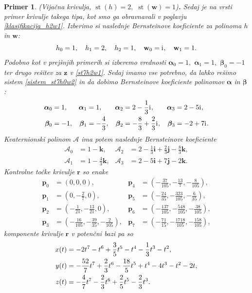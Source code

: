 \documentclass[12pt,a4paper,twoside]{article}
\newcommand{\iu}{\mathrm{i}\mkern1mu} %
\theoremstyle{definition} %
\theoremstyle{plain} %
\theoremstyle{primerstyle}
\newtheorem{primer}[definicija]{Primer}
\numberwithin{equation}{section}  %
\newcommand{\pV}{\mathbf{p}}
\newcommand{\rV}{\mathbf{r}}
\newcommand{\iV}{\mathbf{i}}
\newcommand{\jV}{\mathbf{j}}
\newcommand{\kV}{\mathbf{k}}
\newcommand{\wV}{\mathbf{w}}
\newcommand{\zV}{\mathbf{z}}
\newcommand{\AQ}{\mathcal{A}}
\newcommand{\balpha}{\boldsymbol \alpha}
\newcommand{\bbeta}{\boldsymbol \beta}
\DeclareMathOperator{\st}{st}
\begin{document}
\begin{primer}
	\label{primer_h2w1_vijacna}
	\textnormal{ }(Vijačna krivulja, $\st(h)=2,$ $\st(\wV)=1$)\textbf{.}
	Sedaj je na vrsti primer krivulje takega tipa, kot smo ga obravnavali v poglavju \ref{klasifikacija_h2w1}. Izberimo si naslednje Bernsteinove koeficiente za polinoma $h$ in $\wV$:
	$$h_0=1,\quad h_1=2,\quad h_2=1,\quad\wV_0=\iu,\quad\wV_1=1.$$
	Podobno kot v prejšnjih primerih si izberemo vrednosti $\balpha_0=1,$ $\balpha_1=1,$ $\bbeta_0=-1$ ter drugo rešitev za $\zV$ v \eqref{st7h2w1}. Sedaj imamo vse potrebno, da lahko rešimo sistem \eqref{sistem_st7h0w2} in da dobimo Bernsteinove koeficiente polinomov $\balpha$ in $\bbeta$:
	\begin{align*}
		\balpha_0&=1,&\balpha_1&=1,&\balpha_2&=2-\frac{1}{3}\iu,&\balpha_3&=2-5\iu,\\
		\bbeta_0&=-1,&\bbeta_1&=-\frac{4}{3},&\bbeta_2&=-\frac{8}{3}+\frac{2}{3}\iu,&\bbeta_3&=-2+7\iu.
	\end{align*}
	Kvaternionski polinom $\AQ$ ima potem naslednje Bernsteinove koeficiente
	\begin{align*}
		\AQ_0&=1-\kV,&\AQ_2&=2-\frac{1}{3}\iV+\frac{2}{3}\jV-\frac{8}{3}\kV,\\
		\AQ_1&=1-\frac{4}{3}\kV,&\AQ_3&=2-5\iV+7\jV-2\kV.
	\end{align*}
	Kontrolne točke krivulje $\rV$ so enake
	\begin{align*}
		\pV_0&=(0,0,0),&\pV_4&=\left(-\frac{37}{105},-\frac{13}{7},-\frac{8}{105}\right)\!,\\
		\pV_1&=\left(0,-\frac{2}{7},0\right)\!,&\pV_5&=\left(-\frac{24}{35},-\frac{323}{105},-\frac{6}{35}\right)\!,\\
		\pV_2&=\left(-\frac{1}{21},-\frac{13}{21},0\right)\!,&\pV_6&=\left(-\frac{137}{105},-\frac{548}{105},-\frac{38}{105}\right)\!,\\
		\pV_3&=\left(-\frac{16}{105},-\frac{39}{35},-\frac{2}{105}\right)\!,&\pV_7&=\left(-\frac{71}{15},-\frac{1718}{105},-\frac{158}{105}\right)\!,
	\end{align*}
	komponente krivulje $\rV$ v potenčni bazi pa so
	\begin{align}
		x(t)&=-2t^7-t^6+\frac{3}{5}t^5-t^4-\frac{1}{3}t^3-t^2,\notag\\
		y(t)&=-\frac{52}{7}t^7+\frac{2}{3}t^6-\frac{18}{5}t^5+t^4-4t^3-t^2-2t,\label{primer_h2w1_vijacna_krivulja}\\
		z(t)&=-\frac{4}{7}t^7-\frac{2}{3}t^6+\frac{2}{5}t^5-\frac{2}{3}t^3.\notag
	\end{align}

\end{primer}
\end{document}
